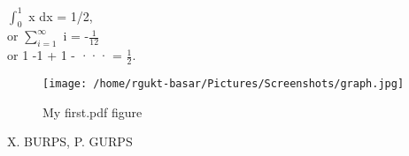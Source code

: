 \documentclass{article}
\begin{document}
 $\int_{0}^{1}$ x dx = 1/2,\\ \vspace{1cm} or \newline
 \vspace{1cm}
 $\sum_{i=1}^{\infty}$ i = -$\frac{1}{12}$ \\ 
 or \newline 
 \hspace{1cm}1 -1 + 1 - ··· = $\frac{1}{2}$.
 \newline
 \begin{figure}[h]
        \centering
        \texttt{[image: /home/rgukt-basar/Pictures/Screenshots/graph.jpg]}
        \caption{My first.pdf figure}
        \label{fig:first}
 \end{figure}
           \newline 
            \vspace{1cm} 
            \newline X. BURPS, P. GURPS
            \newline
\end{document}
